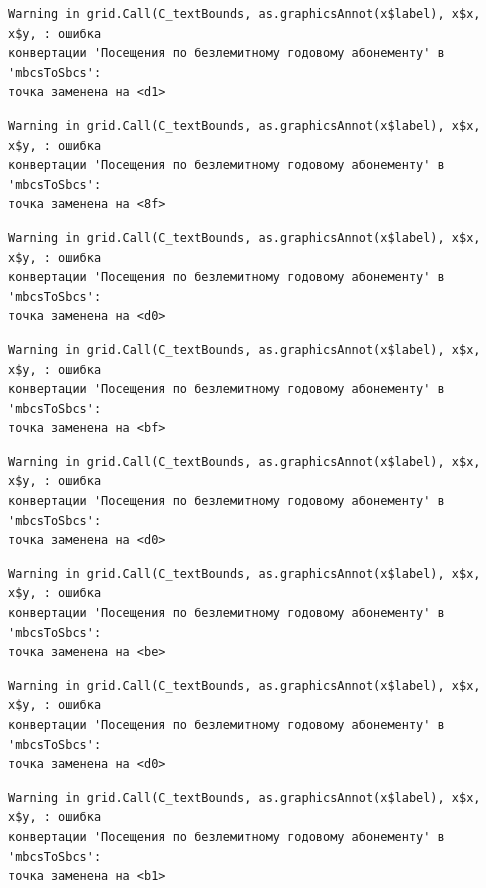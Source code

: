 \documentclass[
  letterpaper,
  DIV=11,
  numbers=noendperiod]{scrreprt}
\begin{document}
\begin{verbatim}
Warning in grid.Call(C_textBounds, as.graphicsAnnot(x$label), x$x, x$y, : ошибка
конвертации 'Посещения по безлемитному годовому абонементу' в 'mbcsToSbcs':
точка заменена на <d1>
\end{verbatim}

\begin{verbatim}
Warning in grid.Call(C_textBounds, as.graphicsAnnot(x$label), x$x, x$y, : ошибка
конвертации 'Посещения по безлемитному годовому абонементу' в 'mbcsToSbcs':
точка заменена на <8f>
\end{verbatim}

\begin{verbatim}
Warning in grid.Call(C_textBounds, as.graphicsAnnot(x$label), x$x, x$y, : ошибка
конвертации 'Посещения по безлемитному годовому абонементу' в 'mbcsToSbcs':
точка заменена на <d0>
\end{verbatim}

\begin{verbatim}
Warning in grid.Call(C_textBounds, as.graphicsAnnot(x$label), x$x, x$y, : ошибка
конвертации 'Посещения по безлемитному годовому абонементу' в 'mbcsToSbcs':
точка заменена на <bf>
\end{verbatim}

\begin{verbatim}
Warning in grid.Call(C_textBounds, as.graphicsAnnot(x$label), x$x, x$y, : ошибка
конвертации 'Посещения по безлемитному годовому абонементу' в 'mbcsToSbcs':
точка заменена на <d0>
\end{verbatim}

\begin{verbatim}
Warning in grid.Call(C_textBounds, as.graphicsAnnot(x$label), x$x, x$y, : ошибка
конвертации 'Посещения по безлемитному годовому абонементу' в 'mbcsToSbcs':
точка заменена на <be>
\end{verbatim}

\begin{verbatim}
Warning in grid.Call(C_textBounds, as.graphicsAnnot(x$label), x$x, x$y, : ошибка
конвертации 'Посещения по безлемитному годовому абонементу' в 'mbcsToSbcs':
точка заменена на <d0>
\end{verbatim}

\begin{verbatim}
Warning in grid.Call(C_textBounds, as.graphicsAnnot(x$label), x$x, x$y, : ошибка
конвертации 'Посещения по безлемитному годовому абонементу' в 'mbcsToSbcs':
точка заменена на <b1>
\end{verbatim}
\end{document}
